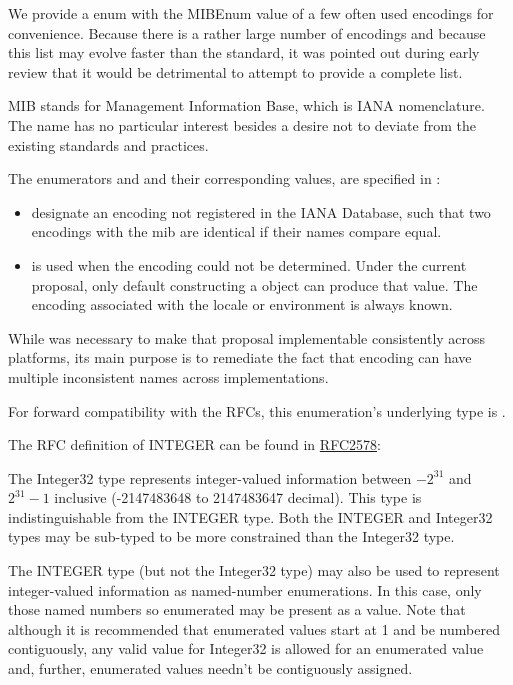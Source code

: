 \documentclass{wg21}
\begin{document}
We provide a  enum with the MIBEnum value of a few often used encodings for convenience.
Because there is a rather large number of encodings and because this list may evolve faster than the standard, it was pointed out during early review that it would be detrimental to attempt to provide a complete list.
\begin{note}
MIB stands for Management Information Base, which is IANA nomenclature. The name has no particular interest besides a desire not to deviate from the existing standards and practices.
\end{note}


The enumerators  and and their corresponding values, are specified in \cite{ianacharset-mib}:

\begin{itemize}
	\item {} designate an encoding not registered in the IANA Database, such that two encodings with the  mib are identical if their names compare equal.
	\item {} is used when the encoding could not be determined. Under the current proposal,  only default constructing a  object can produce that value. The encoding associated with the locale or environment is always known.
\end{itemize}

While  was necessary to make that proposal implementable consistently across platforms,
its main purpose is to remediate the fact that encoding can have multiple inconsistent names across implementations.

For forward compatibility with the RFCs, this enumeration's underlying type is .

The RFC definition of INTEGER can be found in \href{https://datatracker.ietf.org/doc/html/rfc2578#section-7.1.1}{RFC2578}:

\begin{quoteblock}
The Integer32 type represents integer-valued information between
$-2^{31}$ and $2^{31}-1$ inclusive (-2147483648 to 2147483647 decimal).  This
type is indistinguishable from the INTEGER type.  Both the INTEGER
and Integer32 types may be sub-typed to be more constrained than the
Integer32 type.

The INTEGER type (but not the Integer32 type) may also be used to
represent integer-valued information as named-number enumerations.
In this case, only those named numbers so enumerated may be present
as a value.  Note that although it is recommended that enumerated
values start at 1 and be numbered contiguously, any valid value for
Integer32 is allowed for an enumerated value and, further, enumerated
values needn't be contiguously assigned.
\end{quoteblock}
\end{document}
